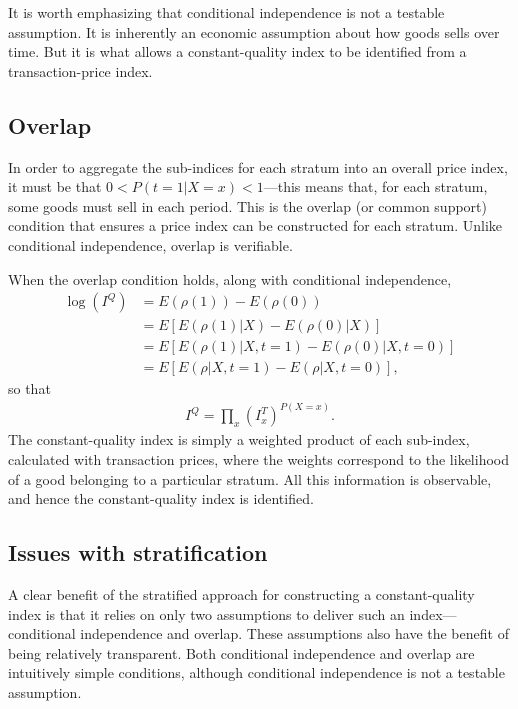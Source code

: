 \documentclass[]{article}
\begin{document}
It is worth emphasizing that conditional independence is not a testable assumption. It is inherently an economic assumption about how goods sells over time. But it is what allows a constant-quality index to be identified from a transaction-price index.

\hypertarget{overlap}{%
\subsection{Overlap}\label{overlap}}

In order to aggregate the sub-indices for each stratum into an overall price index, it must be that \(0 < P(t = 1 | X = x) < 1\)---this means that, for each stratum, some goods must sell in each period. This is the overlap (or common support) condition that ensures a price index can be constructed for each stratum. Unlike conditional independence, overlap is verifiable.

When the overlap condition holds, along with conditional independence,
\begin{align*}
\log(I^{Q}) &= E(\rho(1)) - E(\rho(0)) \\
&= E[E(\rho(1) | X) - E(\rho(0) | X)] \\
&= E[E(\rho(1) | X, t = 1) - E(\rho(0) | X, t = 0)] \\
&= E[E(\rho | X, t = 1) - E(\rho | X, t = 0)],
\end{align*}
so that
\begin{align*}
I^{Q} = \prod_{x} (I^{T}_{x})^{P(X = x)}.
\end{align*}
The constant-quality index is simply a weighted product of each sub-index, calculated with transaction prices, where the weights correspond to the likelihood of a good belonging to a particular stratum. All this information is observable, and hence the constant-quality index is identified.

\hypertarget{issues-with-stratification}{%
\subsection{Issues with stratification}\label{issues-with-stratification}}

A clear benefit of the stratified approach for constructing a constant-quality index is that it relies on only two assumptions to deliver such an index---conditional independence and overlap. These assumptions also have the benefit of being relatively transparent. Both conditional independence and overlap are intuitively simple conditions, although conditional independence is not a testable assumption.
\end{document}
